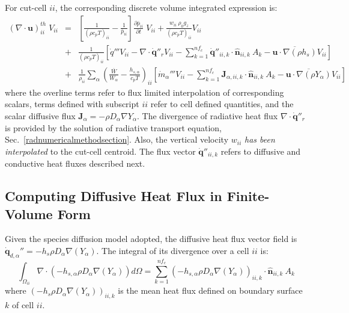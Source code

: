 For cut-cell $ii$, the corresponding discrete volume integrated expression is:
%
\begin{eqnarray}
    ( \nabla \cdot \mathbf{u} )_{ii}^{th} \; V_{ii} &=&
    \left[ \frac{1}{(\rho c_p T)_{ii}} - \frac{1}{\bar{p}_{ii}} \right]
    \frac{\partial \bar{p}_{ii}}{\partial t} \; V_{ii} +
    \frac{w_{ii} \: \rho_0 g_z}{(\rho c_p T)_{ii}} V_{ii} \nonumber \\
    &+& \frac{1}{(\rho c_p T)_{ii}} \left[ \dot{q}''' V_{ii} - \nabla \cdot \dot{\mathbf{q}}''_r V_{ii} -
    \sum_{k=1}^{nf_c} \dot{\mathbf{q}}''_{ii,k} \cdot \hat{\mathbf{n}}_{ii,k} \: A_k
    - \overline{\mathbf{u} \cdot \nabla (\rho h_s)} V_{ii} \right] \nonumber \\
    &+& \frac{1}{\rho_{ii}} \sum_\alpha \left( \frac{\overline{W}}{W_\alpha} - \frac{h_{s,\alpha}}{c_p T} \right)_{ii} \left[ \dot{m}_\alpha''' V_{ii} -
    \sum_{k=1}^{nf_c} \mathbf{J}_{\alpha,ii,k} \cdot \hat{\mathbf{n}}_{ii,k} \: A_k
    - \overline{\mathbf{u} \cdot \nabla (\rho Y_\alpha)} V_{ii} \right] \label{eq:divth2}
\end{eqnarray}
%
where the overline terms refer to flux limited interpolation of corresponding scalars, terms defined with subscript $ii$ refer to cell defined quantities, and the scalar diffusive flux $\mathbf{J}_\alpha=- \rho D_\alpha \nabla Y_\alpha$. The divergence of radiative heat flux $\nabla \cdot \dot{\mathbf{q}}''_r$ is provided by the solution of radiative transport equation, Sec.~\ref{radnumericalmethodsection}.  Also, the vertical velocity $w_{ii}$ \textit{has been interpolated} to the cut-cell centroid. The flux vector $\dot{\mathbf{q}}''_{ii,k}$ refers to diffusive and conductive heat fluxes described next.

\subsection{Computing Diffusive Heat Flux in Finite-Volume Form}

Given the species diffusion model adopted, the diffusive heat flux vector field is $\dot{\mathbf{q}}_{d,\alpha}''=-h_s \rho D_\alpha \nabla(Y_\alpha)$. The integral of its divergence over a cell $ii$ is:
\begin{equation}
    \int_{\Omega_{ii}} {\nabla \cdot \left(-h_{s,\alpha} \rho D_\alpha \nabla(Y_\alpha) \right)} d\Omega = \sum_{k=1}^{nf_c} \left(-h_{s,\alpha} \rho D_\alpha \nabla(Y_\alpha) \right)_{ii,k} \cdot \hat{\mathbf{n}}_{ii,k}  \: A_k
\end{equation}
where $\left(-h_s \rho D_\alpha \nabla(Y_\alpha) \right)_{ii,k}$ is the mean heat flux defined on boundary surface $k$ of cell $ii$.


